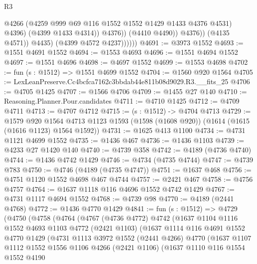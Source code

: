 \begin{lexlean}{R3}
\begin{coremodule}
                                @4266
                                (@4259 @999 @69 @116 @1552 @1552 @1429 @1433 @4376 @4531)
                                @4396)
                              (@4399 @1433 @4314))
                            @4376))
                        (@4410 @4490))
                      @4376))
                  (@4135 @4571))
                @4435)
              (@4399 @4572 @4237))))))
@4691 := @3973 @1552
@4693 := @1551 @4691 @1552
@4694 := @1553 @4693
@4696 := @1551 @4694 @1552
@4697 := @1551 @4696
@4698 := @4697 @1552
@4699 := @1553 @4698
@4702 := fun (s : @1512) => @1551 @4699 @1552
@4704 := @1560 @920 @1564
@4705 := LexLeanPreserve.Cc4bcfca7162c3bbdab44e811b08d9029.R3.__fits_25
@4706 := @4705 @1425
@4707 := @1566 @4706
@4709 := @1455 @27 @140
@4710 := Reasoning.Planner.Pour.candidates
@4711 := @4710 @1425
@4712 := @4709 @4711
@4713 := @4707 @4712
@4715 := (s : @1512) -> @4704 @4713
@4729 := @1579
    @920
    @1564
    @4713
    @1123
    @1593
    (@1598 (@1608 @920))
    (@1614 (@1615 (@1616 @1123) @1564 @1592))
@4731 := @1625 @413 @1100
@4734 := @4731 @1121 @4699 @1552
@4735 := @1436 @467
@4736 := @1436 @1103
@4739 := @4233 @27 @1420 @140
@4740 := @4739 @358
@4742 := @4189 (@4736 @4740)
@4744 := @1436 @4742 @1429
@4746 := @4734 (@4735 @4744)
@4747 := @4739 @783
@4750 := @4746 (@4189 (@4735 @4747))
@4751 := @1637 @468
@4756 := @4751 @1120 @1552 @4698 @467 @4744
@4757 := @2421 @467
@4758 := @4756 @4757
@4764 := @1637 @1118 @116 @4696 @1552 @4742 @1429
@4767 := @4731 @1117 @4694 @1552
@4768 := @4739 @98
@4770 := @4189 (@2441 @4768)
@4772 := @1436 @4770 @1429
@4841 := fun (s : @1512) =>
  @4729
    (@4750
      (@4758
        (@4764
          (@4767
            (@4736 @4772)
            @4742
            (@1637
              @1104
              @1116
              @1552
              @4693
              @1103
              @4772
              (@2421 @1103)
              (@1637
                @1114
                @116
                @4691
                @1552
                @4770
                @1429
                (@4731
                  @1113
                  @3972
                  @1552
                  (@2441 @4266)
                  @4770
                  (@1637
                    @1107
                    @1112
                    @1552
                    @1556
                    @1106
                    @4266
                    (@2421 @1106)
                    (@1637
                      @1110
                      @116
                      @1554
                      @1552
                      @4190

\end{coremodule}
\end{lexlean}
